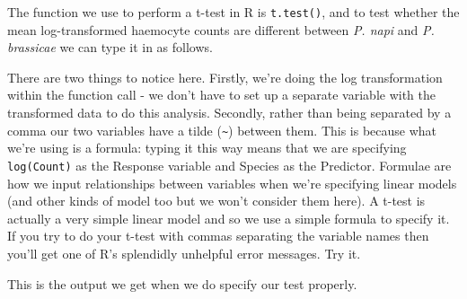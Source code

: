 \documentclass[
]{book}
\newenvironment{Shaded}{\begin{snugshade}}{\end{snugshade}}
\newcommand{\ControlFlowTok}[1]{\textcolor[rgb]{0.13,0.29,0.53}{\textbf{#1}}}
\newcommand{\DecValTok}[1]{\textcolor[rgb]{0.00,0.00,0.81}{#1}}
\newcommand{\FloatTok}[1]{\textcolor[rgb]{0.00,0.00,0.81}{#1}}
\newcommand{\KeywordTok}[1]{\textcolor[rgb]{0.13,0.29,0.53}{\textbf{#1}}}
\newcommand{\NormalTok}[1]{#1}
\newcommand{\OperatorTok}[1]{\textcolor[rgb]{0.81,0.36,0.00}{\textbf{#1}}}
\newcommand{\StringTok}[1]{\textcolor[rgb]{0.31,0.60,0.02}{#1}}
\begin{document}
The function we use to perform a t-test in R is \texttt{t.test()}, and to test whether the mean log-transformed haemocyte counts are different between \emph{P. napi} and \emph{P. brassicae} we can type it in as follows.

\begin{Shaded}
\end{Shaded}

There are two things to notice here. Firstly, we're doing the log transformation within the function call - we don't have to set up a separate variable with the transformed data to do this analysis. Secondly, rather than being separated by a comma our two variables have a tilde (\texttt{\textasciitilde{}}) between them. This is because what we're using is a formula: typing it this way means that we are specifying \texttt{log(Count)} as the Response variable and Species as the Predictor. Formulae are how we input relationships between variables when we're specifying linear models (and other kinds of model too but we won't consider them here). A t-test is actually a very simple linear model and so we use a simple formula to specify it. If you try to do your t-test with commas separating the variable names then you'll get one of R's splendidly unhelpful error messages. Try it.

This is the output we get when we do specify our test properly.

\begin{Shaded}
\end{Shaded}
\end{document}
